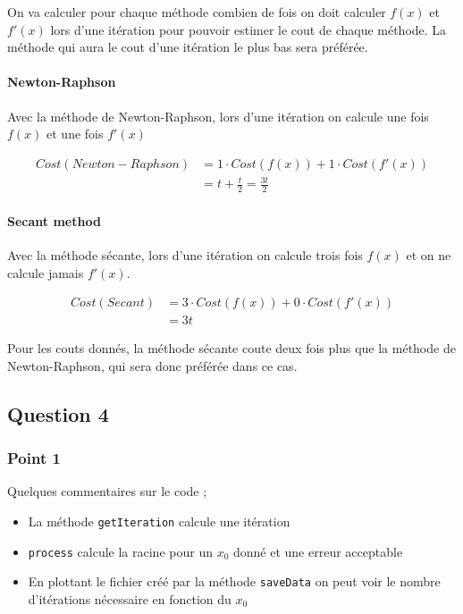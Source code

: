 On va calculer pour chaque méthode combien de fois on doit calculer $f(x)$ et $f'(x)$ lors d'une itération pour pouvoir estimer le cout de chaque méthode. La méthode qui aura le cout d'une itération le plus bas sera préférée.

\paragraph{Newton-Raphson}Avec la méthode de Newton-Raphson, lors d'une itération on calcule une fois $f(x)$ et une fois $f'(x)$

\begin{equation}
	\begin{aligned}
		Cost(Newton-Raphson) &= 1 \cdot Cost(f(x)) + 1 \cdot Cost(f'(x))\\
		&= t + \frac{t}{2} = \frac{3t}{2}
	\end{aligned}
\end{equation}

\paragraph{Secant method}Avec la méthode sécante, lors d'une itération on calcule trois fois $f(x)$ et on ne calcule jamais $f'(x)$.

\begin{equation}
	\begin{aligned}
		Cost(Secant) &= 3 \cdot Cost(f(x)) + 0 \cdot Cost(f'(x))\\
		&= 3t
	\end{aligned}
\end{equation}

Pour les couts donnés, la méthode sécante coute deux fois plus que la méthode de Newton-Raphson, qui sera donc préférée dans ce cas.

\subsection{Question 4}

\subsubsection{Point 1}


Quelques commentaires sur le code ;

\begin{itemize}
\item La méthode \texttt{getIteration} calcule une itération
\item \texttt{process} calcule la racine pour un $x_0$ donné et une erreur acceptable
\item En plottant le fichier créé par la méthode \texttt{saveData} on peut voir le nombre d'itérations nécessaire en fonction du $x_0$
\end{itemize}

